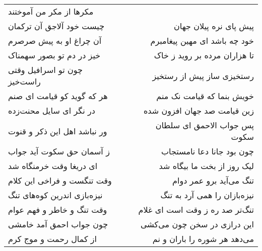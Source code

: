 \begin{center}
\begin{longtable}{l p{0.5cm} r}
مکرها از مکر من آموختند
\\
چیست خود آلاجق آن ترکمان
&&
پیش پای نره پیلان جهان
\\
آن چراغ او به پیش صرصرم
&&
خود چه باشد ای مهین پیغامبرم
\\
خیز در دم تو بصور سهمناک
&&
تا هزاران مرده بر روید ز خاک
\\
چون تو اسرافیل وقتی راست‌خیز
&&
رستخیزی ساز پیش از رستخیز
\\
هر که گوید کو قیامت ای صنم
&&
خویش بنما که قیامت نک منم
\\
در نگر ای سایل محنت‌زده
&&
زین قیامت صد جهان افزون شده
\\
ور نباشد اهل این ذکر و قنوت
&&
پس جواب الاحمق ای سلطان سکوت
\\
ز آسمان حق سکوت آید جواب
&&
چون بود جانا دعا نامستجاب
\\
ای دریغا وقت خرمنگاه شد
&&
لیک روز از بخت ما بیگاه شد
\\
وقت تنگست و فراخی این کلام
&&
تنگ می‌آید برو عمر دوام
\\
نیزه‌بازی اندرین کوه‌های تنگ
&&
نیزه‌بازان را همی آرد به تنگ
\\
وقت تنگ و خاطر و فهم عوام
&&
تنگ‌تر صد ره ز وقت است ای غلام
\\
چون جواب احمق آمد خامشی
&&
این درازی در سخن چون می‌کشی
\\
از کمال رحمت و موج کرم
&&
می‌دهد هر شوره را باران و نم
\\
\end{longtable}
\end{center}
